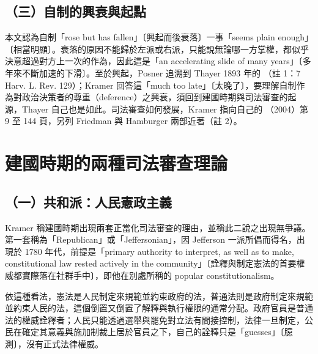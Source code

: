 \subsection{（三）自制的興衰與起點}

本文認為自制「rose but has fallen」〔興起而後衰落〕一事「seems plain enough」〔相當明顯〕。衰落的原因不能歸於左派或右派，只能說無論哪一方掌權，都似乎決意超過對方上一次的作為，因此這是「an accelerating slide of many years」〔多年來不斷加速的下滑〕。至於興起，Posner 追溯到 Thayer 1893 年的 （註 1：7 Harv. L. Rev. 129）；Kramer 回答這「much too late」〔太晚了〕，要理解自制作為對政治決策者的尊重（deference）之興衰，須回到建國時期與司法審查的起源，Thayer 自己也是如此。司法審查如何發展，Kramer 指向自己的 （2004）第 9 至 144 頁，另列 Friedman 與 Hamburger 兩部近著（註 2）。

\section{建國時期的兩種司法審查理論}
\label{sec:Kramer-2}

\subsection{（一）共和派：人民憲政主義}

Kramer 稱建國時期出現兩套正當化司法審查的理由，並稱此二說之出現無爭議。第一套稱為「Republican」或「Jeffersonian」，因 Jefferson 一派所倡而得名，出現於 1780 年代，前提是「primary authority to interpret, as well as to make, constitutional law rested actively in the community」〔詮釋與制定憲法的首要權威都實際落在社群手中〕，即他在別處所稱的 popular constitutionalism。

依這種看法，憲法是人民制定來規範並約束政府的法，普通法則是政府制定來規範並約束人民的法，這個倒置又倒置了解釋與執行權限的通常分配。政府官員是普通法的權威詮釋者；人民只能透過選舉與罷免對立法有間接控制，法律一旦制定，公民在確定其意義與施加制裁上居於官員之下，自己的詮釋只是「guesses」〔臆測〕，沒有正式法律權威。

